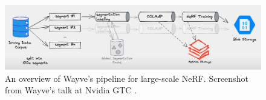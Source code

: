 \begin{figure}[!h]
    \centering
    \includegraphics[width=1.0\textwidth]{figures/wayve-pipeline.png}
    \caption[Wayve's large-scale NeRF pipeline]{An overview of Wayve's pipeline for large-scale NeRF. Screenshot from Wayve's talk at Nvidia GTC \cite{sokolski2023building}.}
    \label{fig:wayve-pipeline}
\end{figure}